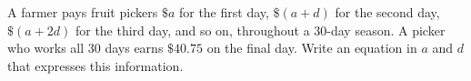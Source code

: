 A farmer pays fruit pickers $\$a$ for the first day, $\$(a+d)$ for the second day, $\$(a+2d)$ for the third day, and so on, throughout a $30$-day season. A picker who works all $30$ days earns $\$40.75$ on the final day. Write an equation in $a$ and $d$ that expresses this information.

